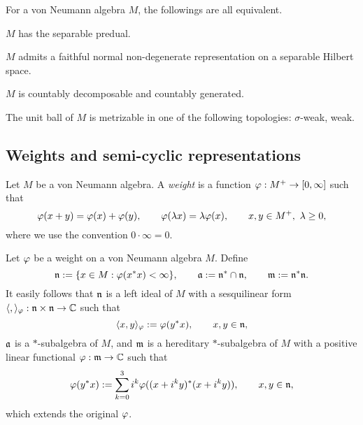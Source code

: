 \documentclass{../../small}
\begin{document}
\begin{prop}
For a von Neumann algebra $M$, the followings are all equivalent.
\begin{parts}
\item $M$ has the separable predual.
\item $M$ admits a faithful normal non-degenerate representation on a separable Hilbert space.
\item $M$ is countably decomposable and countably generated.
\item The unit ball of $M$ is metrizable in one of the following topologies: $\sigma$-weak, weak.
\end{parts}
\end{prop}


\subsection{Weights and semi-cyclic representations}


\begin{defn}[Weights]
Let $M$ be a von Neumann algebra.
A \emph{weight} is a function $\varphi:M^+\to[0,\infty]$ such that
\[\varphi(x+y)=\varphi(x)+\varphi(y),\qquad\varphi(\lambda x)=\lambda\varphi(x),\qquad x,y\in M^+,\ \lambda\ge0,\]
where we use the convention $0\cdot\infty=0$.
\end{defn}

\begin{defn}
Let $\varphi$ be a weight on a von Neumann algebra $M$.
Define
\[\mathfrak{n}:=\{x\in M:\varphi(x^*x)<\infty\},\qquad\mathfrak{a}:=\mathfrak{n}^*\cap\mathfrak{n},\qquad\mathfrak{m}:=\mathfrak{n}^*\mathfrak{n}.\]
It easily follows that $\mathfrak{n}$ is a left ideal of $M$ with a sesquilinear form $\langle,\rangle_\varphi:\mathfrak{n}\times\mathfrak{n}\to\mathbb{C}$ such that
\[\langle x,y\rangle_\varphi:=\varphi(y^*x),\qquad x,y\in\mathfrak{n},\]
$\mathfrak{a}$ is a $*$-subalgebra of $M$, and $\mathfrak{m}$ is a hereditary $*$-subalgebra of $M$ with a positive linear functional $\varphi:\mathfrak{m}\to\mathbb{C}$ such that
\[\varphi(y^*x):=\sum_{k=0}^3i^k\varphi((x+i^ky)^*(x+i^ky)),\qquad x,y\in\mathfrak{n},\]
which extends the original $\varphi$.
\end{defn}
\end{document}
